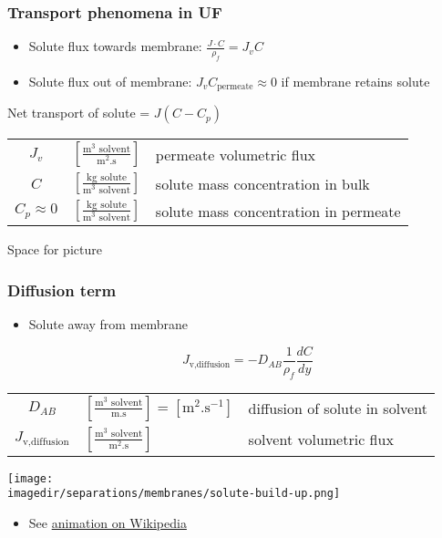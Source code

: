 \begin{frame}\frametitle{Transport phenomena in UF}
	\begin{itemize}
		\item	Solute flux towards membrane: $\displaystyle \frac{J\cdot C}{\rho_f} = J_v C$
		\\		
		\item	Solute flux out of membrane: $J_v C_\text{permeate} \approx 0$  {\tiny if membrane retains solute}
	\end{itemize}
	\begin{exampleblock}{}
		Net transport of solute = $J(C - C_p)$
	\end{exampleblock}
	
	\begin{tabular}{cll}
		$J_v$		&	$\left[\displaystyle\frac{\text{m}^3 \text{~solvent}}{\text{m}^2 \text{.s}}\right]$	& permeate volumetric flux \\
		$C$ 		&  	$\left[\displaystyle\frac{\text{kg} \text{~solute}}{\text{m}^3 \text{~solvent}}\right]$	& solute mass concentration in bulk\\
		$C_p \approx 0$ &  	$\left[\displaystyle\frac{\text{kg} \text{~solute}}{\text{m}^3 \text{~solvent}}\right]$	& solute mass concentration in permeate\\
	\end{tabular}
	\vfill
	{\tiny Space for picture}
\end{frame}

\begin{frame}\frametitle{Diffusion term}
	\begin{itemize}
		\item	Solute {\color{purple}{diffusion}} away from membrane
		\begin{exampleblock}{}
			\[	
				J_\text{v,diffusion} = -D_{AB} \displaystyle \frac{1}{\rho_f}\frac{dC}{dy}
			\]
		\end{exampleblock}		
	\end{itemize}
	
	\begin{tabular}{cll}
		$D_{AB}$				&	$\left[\displaystyle\frac{\text{m}^3 \text{~solvent}}{\text{m.s}}\right] = \left[\text{m}^2\text{.s}^{-1}\right]$	& diffusion of solute in solvent \\
		$J_\text{v,diffusion}$ 	&  	$\left[\displaystyle\frac{\text{m}^3 \text{~solvent}}{\text{m}^2 \text{.s}}\right]$	& solvent volumetric flux\\
	\end{tabular}
	\begin{center}
		\texttt{[image: \\imagedir/separations/membranes/solute-build-up.png]}
	\end{center}
	\vspace{-6pt}
	\begin{itemize}
		\item	See \href{http://en.wikipedia.org/wiki/File:DiffusionMicroMacro.gif}{animation on Wikipedia}
	\end{itemize}
\end{frame}

